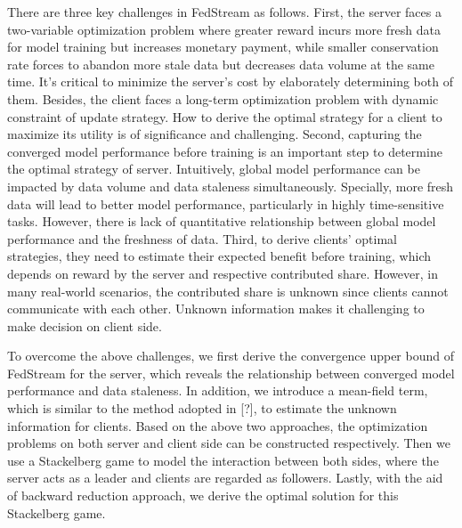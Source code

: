 \documentclass{article}
\theoremstyle{plain}
\theoremstyle{definition}
\theoremstyle{remark}
\begin{document}
There are three key challenges in FedStream as follows.
First, the server faces a two-variable optimization problem where greater reward incurs more fresh data for model training but increases monetary payment, while smaller conservation rate forces to abandon more stale data but decreases data volume at the same time. It's critical to minimize the server's cost by elaborately determining both of them.
Besides, the client faces a long-term optimization problem with dynamic constraint of update strategy. How to derive the optimal strategy for a client to maximize its utility is of significance and challenging.
Second, capturing the converged model performance before training is an important step to determine the optimal strategy of server. Intuitively, global model performance can be impacted by data volume and data staleness simultaneously. Specially, more fresh data will lead to better model performance, particularly in highly time-sensitive tasks. However, there is lack of quantitative relationship between global model performance and the freshness of data.
Third, to derive clients' optimal strategies, they need to estimate their expected benefit before training, which depends on reward by the server and respective contributed share. However, in many real-world scenarios, the contributed share is unknown since clients cannot communicate with each other. Unknown information makes it challenging to make decision on client side.

To overcome the above challenges, we first derive the convergence upper bound of FedStream for the server, which reveals the relationship between converged model performance and data staleness.
In addition, we introduce a mean-field term, which is similar to the method adopted in [?], to estimate the unknown information for clients.
Based on the above two approaches, the optimization problems on both server and client side can be constructed respectively.
Then we use a Stackelberg game to model the interaction between both sides, where the server acts as a leader and clients are regarded as followers.
Lastly, with the aid of backward reduction approach, we derive the optimal solution for this Stackelberg game.
\end{document}
